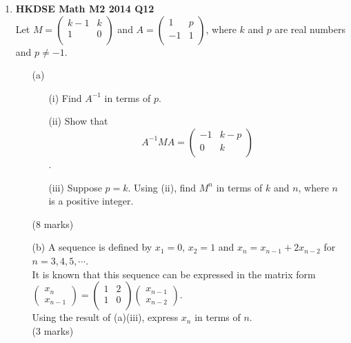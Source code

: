 \documentclass{report}
\begin{document}
\begin{enumerate}
	\item \textbf{HKDSE Math M2 2014 Q12}\\
	Let $M = \begin{pmatrix}
		k-1&k\\
		1  &0\\
	\end{pmatrix}$ and $A = \begin{pmatrix}
		1&p\\
		-1&1\\
	\end{pmatrix}$, where $k$ and $p$ are real numbers and $p \neq -1$. 
	\begin{enumerate}
		\item [(a)]
		\begin{enumerate}
			\item [(i)]Find $A^{-1}$ in terms of $p$. 
			\item [(ii)]Show that $$A^{-1}MA =  
			\begin{pmatrix}
				-1&k-p\\
				0 &k\\
			\end{pmatrix}$$. 
			\item [(iii)]Suppose $p = k$. Using (ii), find $M^n$ in terms of $k$ and $n$, where $n$ is a positive integer.
		\end{enumerate}
		(8 marks)
		\item [(b)]A sequence is defined by $x_1 = 0$, $x_2 = 1$ and $x_n = x_{n-1} + 2x_{n-2}$ for $n = 3,4,5,\cdots$. \\
			It is known that this sequence can be expressed in the matrix form $\begin{pmatrix} x_n\\x_{n-1} \end{pmatrix} = \begin{pmatrix} 1&2\\1&0\\ \end{pmatrix}\begin{pmatrix} x_{n-1}\\x_{n-2} \end{pmatrix}$.\\
			Using the result of (a)(iii), express $x_n$ in terms of $n$. \\(3 marks)
	\end{enumerate}

	\newpage


\end{enumerate}
\end{document}
